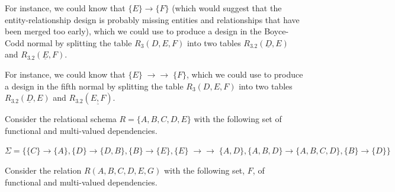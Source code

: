 \documentclass[10pt,a4paper,answers]{exam}
\newcommand {\mvd}{\mbox{$\; \rightarrow \! \! \! \! \rightarrow \; $}}
\newcounter{sol}
\begin{document}
\begin{questions}
\begin{parts}
\begin{solution}
For instance, we could know that $\{E\}\rightarrow\{F\}$ (which would suggest that the entity-relationship design is probably missing entities and relationships that have been merged too early), which we could use to produce a design in the Boyce-Codd normal by splitting the table $R_3(D, E, F)$ into two tables $R_{3.2}(\underline{D}, E)$ and $R_{3.2}(\underline{E}, F)$.


For instance, we could know that $\{E\}\mvd\{F\}$, which we could use to produce a design in the fifth normal by splitting the table $R_3(D, E, F)$ into two tables $R_{3.2}(\underline{D}, E)$ and $R_{3.2}(\underline{E, F})$.


\end{solution}
\end{parts}


\question Consider the relational schema $R=\{A, B, C, D, E\}$ with the following set of functional and multi-valued dependencies.

$\Sigma=\{ \{C\}\rightarrow\{A\},  \{D\} \rightarrow \{D, B\}, \{B\} \rightarrow \{E\}, \{E\} \mvd \{A, D\}, \{A, B, D\} \rightarrow \{A, B, C, D\}, \{B\} \rightarrow \{D\}\}$


\question Consider the  relation $R(A, B, C, D, E, G)$ with the following set, $F$, of functional and multi-valued dependencies. 


\end{questions}
\end{document}
